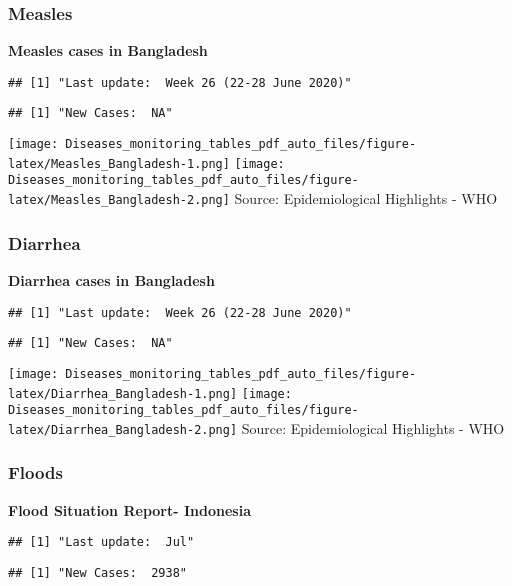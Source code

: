 \documentclass[]{article}
\begin{document}
\hypertarget{measles}{%
\subsubsection{Measles}\label{measles}}

\textbf{Measles cases in Bangladesh}

\begin{verbatim}
## [1] "Last update:  Week 26 (22-28 June 2020)"
\end{verbatim}

\begin{verbatim}
## [1] "New Cases:  NA"
\end{verbatim}

\texttt{[image: Diseases\_monitoring\_tables\_pdf\_auto\_files/figure-latex/Measles\_Bangladesh-1.png]}
\texttt{[image: Diseases\_monitoring\_tables\_pdf\_auto\_files/figure-latex/Measles\_Bangladesh-2.png]}
Source: Epidemiological Highlights - WHO \pagebreak

\hypertarget{diarrhea}{%
\subsubsection{Diarrhea}\label{diarrhea}}

\textbf{Diarrhea cases in Bangladesh}

\begin{verbatim}
## [1] "Last update:  Week 26 (22-28 June 2020)"
\end{verbatim}

\begin{verbatim}
## [1] "New Cases:  NA"
\end{verbatim}

\texttt{[image: Diseases\_monitoring\_tables\_pdf\_auto\_files/figure-latex/Diarrhea\_Bangladesh-1.png]}
\texttt{[image: Diseases\_monitoring\_tables\_pdf\_auto\_files/figure-latex/Diarrhea\_Bangladesh-2.png]}
Source: Epidemiological Highlights - WHO \pagebreak

\hypertarget{floods}{%
\subsubsection{Floods}\label{floods}}

\textbf{Flood Situation Report- Indonesia}

\begin{verbatim}
## [1] "Last update:  Jul"
\end{verbatim}

\begin{verbatim}
## [1] "New Cases:  2938"
\end{verbatim}
\end{document}
